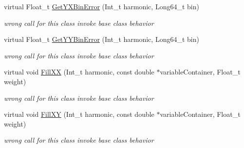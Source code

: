 \begin{DoxyCompactItemize}
virtual Float\+\_\+t \mbox{\hyperlink{classQn_1_1CorrectionProfileCorrelationComponents_aa5af19d9bf922e6be18b0f5a651a8c45}{Get\+Y\+X\+Bin\+Error}} (Int\+\_\+t harmonic, Long64\+\_\+t bin)
\begin{DoxyCompactList}\small\item\em wrong call for this class invoke base class behavior \end{DoxyCompactList}\item 
\mbox{\label{classQn_1_1CorrectionProfileCorrelationComponents_a652f4c83e72679161bd7ea35e84a6229}} 
virtual Float\+\_\+t \mbox{\hyperlink{classQn_1_1CorrectionProfileCorrelationComponents_a652f4c83e72679161bd7ea35e84a6229}{Get\+Y\+Y\+Bin\+Error}} (Int\+\_\+t harmonic, Long64\+\_\+t bin)
\begin{DoxyCompactList}\small\item\em wrong call for this class invoke base class behavior \end{DoxyCompactList}\item 
\mbox{\label{classQn_1_1CorrectionProfileCorrelationComponents_a352ac53b7545ddbf21af77fb52f1581e}} 
virtual void \mbox{\hyperlink{classQn_1_1CorrectionProfileCorrelationComponents_a352ac53b7545ddbf21af77fb52f1581e}{Fill\+XX}} (Int\+\_\+t harmonic, const double $\ast$variable\+Container, Float\+\_\+t weight)
\begin{DoxyCompactList}\small\item\em wrong call for this class invoke base class behavior \end{DoxyCompactList}\item 
\mbox{\label{classQn_1_1CorrectionProfileCorrelationComponents_a19373de52bf2370215a6b6e9a34c042a}} 
virtual void \mbox{\hyperlink{classQn_1_1CorrectionProfileCorrelationComponents_a19373de52bf2370215a6b6e9a34c042a}{Fill\+XY}} (Int\+\_\+t harmonic, const double $\ast$variable\+Container, Float\+\_\+t weight)
\begin{DoxyCompactList}\small\item\em wrong call for this class invoke base class behavior \end{DoxyCompactList}\item 
\mbox{\label{classQn_1_1CorrectionProfileCorrelationComponents_a0404a6067482047e3be1a92dbf475cd6}} 

\end{DoxyCompactItemize}
